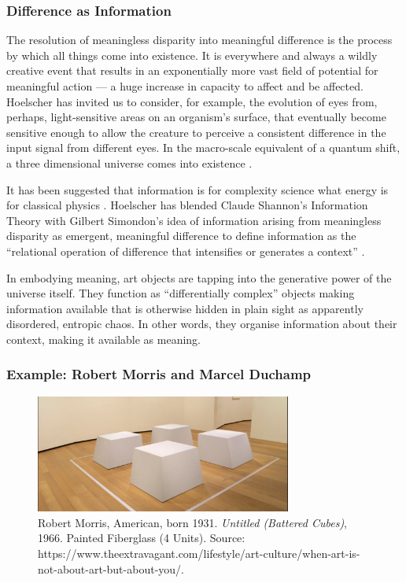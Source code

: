 \documentclass[letterpaper]{article}
\begin{document}
    \subsubsection{Difference as Information}

    The resolution of meaningless disparity into meaningful difference is the process by which all things come into existence. It is everywhere and always a wildly creative event that results in an exponentially more vast field of potential for meaningful action — a huge increase in capacity to affect and be affected. Hoelscher has invited us to consider, for example, the evolution of eyes from, perhaps, light-sensitive areas on an organism's surface, that eventually become sensitive enough to allow the creature to perceive a consistent difference in the input signal from different eyes. In the macro-scale equivalent of a quantum shift, a three dimensional universe comes into existence \citep[p.5]{HoelscherArtAsInfrmtn2021}.

    It has been suggested that information is for complexity science what energy is for classical physics \citep[0:52]{CrutchfieldIntrdctnToCmplxty2018} \citep{CrutfieldRtAlSgntrsOfInfnty2015}. Hoelscher has blended Claude Shannon's Information Theory with Gilbert Simondon's idea of information arising from meaningless disparity as emergent, meaningful difference to define information as the “relational operation of difference that intensifies or generates a context” \citep[p.6]{HoelscherArtAsInfrmtn2021}.
    
    In embodying meaning, art objects are tapping into the generative power of the universe itself. They function as “differentially complex” \citep[p.74]{HoelscherArtAsInfrmtn2021} objects making information available that is otherwise hidden in plain sight as apparently disordered, entropic chaos. In other words, they organise information about their context, making it available as meaning.

    \subsubsection{Example: Robert Morris and Marcel Duchamp}

    \begin{figure}[h]
    \includegraphics[width=3.31in]{robert-morris-cubes.png}
    \caption{Robert Morris, American, born 1931. \emph{Untitled (Battered Cubes)}, 1966. Painted Fiberglass (4 Units). Source: https://www.theextravagant.com/lifestyle/art-culture/when-art-is-not-about-art-but-about-you/.}
    \end{figure}
\end{document}
